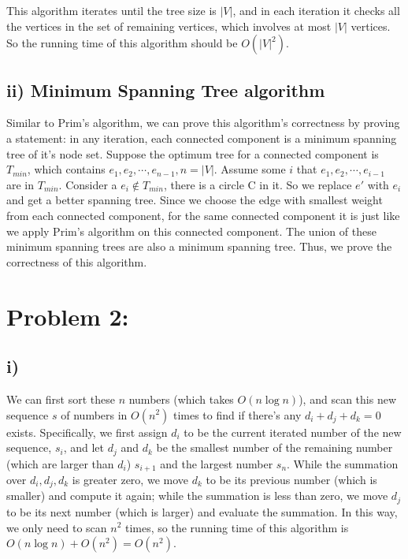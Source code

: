 This algorithm iterates until the tree size is $|V|$, and in each iteration it checks all the vertices in the set of remaining vertices, which involves at most $|V|$ vertices.  So the running time of this algorithm should be $O(|V|^2)$.

\subsection*{ii) Minimum Spanning Tree algorithm}

Similar to Prim's algorithm, we can prove this algorithm's correctness by proving a statement: in any iteration, each connected component is a minimum spanning tree of it's node set.  Suppose the optimum tree for a connected component is $T_{min}$, which contains $e_1, e_2, \cdots, e_{n-1}, n = |V|$.  Assume some $i$ that $e_1, e_2, \cdots, e_{i-1}$ are in $T_{min}$.  Consider a $e_i \notin T_{min}$, there is a circle C in it.  So we replace $e'$ with $e_i$ and get a better spanning tree.  Since we choose the edge with smallest weight from each connected component, for the same connected component it is just like we apply Prim's algorithm on this connected component.  The union of these minimum spanning trees are also a minimum spanning tree.  Thus, we prove the correctness of this algorithm.


\section*{Problem 2:}
\subsection*{i)}

We can first sort these $n$ numbers (which takes $O(n\log n)$), and scan this new sequence $s$ of numbers in $O(n^2)$ times to find if there's any $d_i + d_j + d_k = 0$ exists.  Specifically, we first assign $d_i$ to be the current iterated number of the new sequence, $s_i$, and let $d_j$ and $d_k$ be the smallest number of the remaining number (which are larger than $d_i$) $s_{i+1}$ and the largest number $s_n$.  While the summation over $d_i, d_j, d_k$ is greater zero, we move $d_k$ to be its previous number (which is smaller) and compute it again; while the summation is less than zero, we move $d_j$ to be its next number (which is larger) and evaluate the summation.  In this way, we only need to scan $n^2$ times, so the running time of this algorithm is $O(n\log n) + O(n^2) = O(n^2)$.

